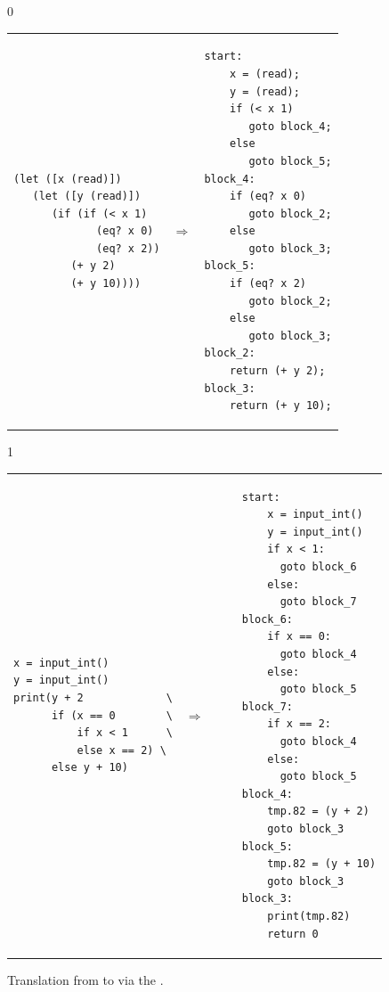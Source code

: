 \documentclass[7x10]{TimesAPriori_MIT}%
\def\racketEd{0}
\def\pythonEd{1}
\def\edition{1}
\newcommand{\pythonColor}[0]{}
\numberwithin{theorem}{chapter}
\numberwithin{definition}{chapter}
\numberwithin{equation}{chapter}
\begin{document}
\begin{figure}[tbp]
\begin{tcolorbox}[colback=white]
{\if\edition\racketEd        
\begin{tabular}{lll}
\begin{minipage}{0.4\textwidth}
\begin{lstlisting}
(let ([x (read)])
   (let ([y (read)])
      (if (if (< x 1)
             (eq? x 0)
             (eq? x 2))
         (+ y 2)
         (+ y 10))))
\end{lstlisting}
\end{minipage}
&
$\Rightarrow$
&
\begin{minipage}{0.55\textwidth}
\begin{lstlisting}
start:
    x = (read);
    y = (read);
    if (< x 1)
       goto block_4;
    else
       goto block_5;
block_4:
    if (eq? x 0)
       goto block_2;
    else
       goto block_3;
block_5:
    if (eq? x 2)
       goto block_2;
    else
       goto block_3;
block_2:
    return (+ y 2);
block_3:
    return (+ y 10);
\end{lstlisting}
\end{minipage}
\end{tabular} 
\fi}
{\if\edition\pythonEd\pythonColor
\begin{tabular}{lll}
\begin{minipage}{0.4\textwidth}
\begin{lstlisting}
x = input_int()
y = input_int()
print(y + 2             \
      if (x == 0        \
          if x < 1      \
          else x == 2) \
      else y + 10)
\end{lstlisting}
\end{minipage}
&
$\Rightarrow\qquad$
&
\begin{minipage}{0.55\textwidth}
\begin{lstlisting}
start:
    x = input_int()
    y = input_int()
    if x < 1:
      goto block_6
    else:
      goto block_7
block_6:
    if x == 0:
      goto block_4
    else:
      goto block_5
block_7:
    if x == 2:
      goto block_4
    else:
      goto block_5
block_4:
    tmp.82 = (y + 2)
    goto block_3
block_5:
    tmp.82 = (y + 10)
    goto block_3
block_3:
    print(tmp.82)
    return 0
\end{lstlisting}
\end{minipage}
\end{tabular} 
\fi}
\end{tcolorbox}
\caption{Translation from \LangIf{} to \LangCIf{}
  via the .}
\label{fig:explicate-control-s1-38}
\end{figure}
\end{document}
